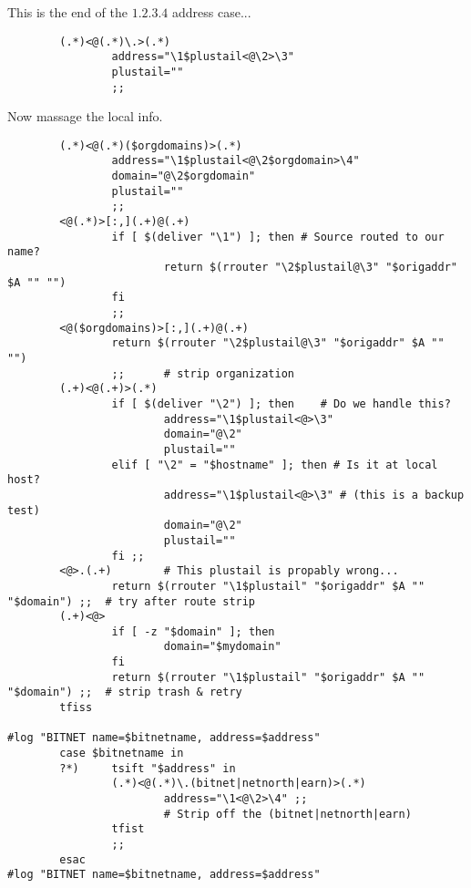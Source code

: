 This is the end of the $1.2.3.4$ address case...

\begin{tscreen}
\begin{verbatim}
        (.*)<@(.*)\.>(.*)
                address="\1$plustail<@\2>\3"
                plustail=""
                ;;
\end{verbatim}
\end{tscreen}


Now massage the local info.

\begin{tscreen}
\begin{verbatim}
        (.*)<@(.*)($orgdomains)>(.*)
                address="\1$plustail<@\2$orgdomain>\4"
                domain="@\2$orgdomain"
                plustail=""
                ;;
        <@(.*)>[:,](.+)@(.+)
                if [ $(deliver "\1") ]; then # Source routed to our name?
                        return $(rrouter "\2$plustail@\3" "$origaddr" $A "" "")
                fi
                ;;
        <@($orgdomains)>[:,](.+)@(.+)
                return $(rrouter "\2$plustail@\3" "$origaddr" $A "" "")
                ;;      # strip organization
        (.+)<@(.+)>(.*)
                if [ $(deliver "\2") ]; then    # Do we handle this?
                        address="\1$plustail<@>\3"
                        domain="@\2"
                        plustail=""
                elif [ "\2" = "$hostname" ]; then # Is it at local host?
                        address="\1$plustail<@>\3" # (this is a backup test)
                        domain="@\2"
                        plustail=""
                fi ;;
        <@>.(.+)        # This plustail is propably wrong...
                return $(rrouter "\1$plustail" "$origaddr" $A "" "$domain") ;;  # try after route strip
        (.+)<@> 
                if [ -z "$domain" ]; then
                        domain="$mydomain"
                fi
                return $(rrouter "\1$plustail" "$origaddr" $A "" "$domain") ;;  # strip trash & retry
        tfiss

#log "BITNET name=$bitnetname, address=$address"
        case $bitnetname in
        ?*)     tsift "$address" in
                (.*)<@(.*)\.(bitnet|netnorth|earn)>(.*)
                        address="\1<@\2>\4" ;;
                        # Strip off the (bitnet|netnorth|earn)
                tfist
                ;;
        esac
#log "BITNET name=$bitnetname, address=$address"
\end{verbatim}
\end{tscreen}


